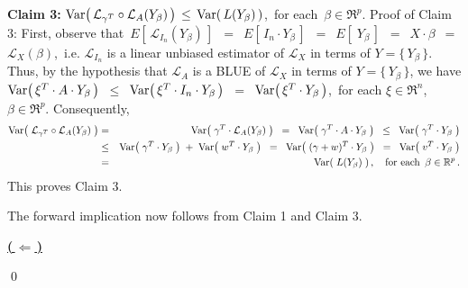 \vskip 0.5cm
\noindent
\textbf{Claim 3:}\quad
$\textnormal{Var}\!\left(\,\mathcal{L}_{\gamma^{T}}\circ\mathcal{L}_{A}(Y_{\beta})\,\right)
\,\leq\,
	\textnormal{Var}\!\left(\,L(Y_{\beta})\,\right)$,\,
for each \,$\beta\in\Re^{p}$.
\vskip 0.1cm
\noindent
Proof of Claim 3:\quad
First, observe that
\,$E\!\left[\,\mathcal{L}_{I_{n}}(Y_{\beta})\,\right]$
\,$=$\, $E\!\left[\,I_{n} \cdot Y_{\beta}\,\right]$
\,$=$\, $E\!\left[\;Y_{\beta}\,\right]$
\,$=$\, $X \cdot \beta$
\,$=$\, $\mathcal{L}_{X}(\beta)$,\,
i.e. $\mathcal{L}_{I_{n}}$ is a linear unbiased estimator of $\mathcal{L}_{X}$
in terms of $Y = \{\,Y_{\beta}\,\}$.
Thus, by the hypothesis that $\mathcal{L}_{A}$ is a BLUE of $\mathcal{L}_{X}$ in terms of $Y = \{\,Y_{\beta}\,\}$,
we have
$\textnormal{Var}\!\left(\,\xi^{T} \cdot A \cdot Y_{\beta}\,\right)$
\,$\leq$\, $\textnormal{Var}\!\left(\,\xi^{T} \cdot I_{n} \cdot Y_{\beta}\,\right)$
\,$=$\, $\textnormal{Var}\!\left(\,\xi^{T} \cdot Y_{\beta}\,\right)$,\,
for each $\xi \in \Re^{n}$, $\beta\in\Re^{p}$.
Consequently,
\begin{eqnarray*}
\Var\!\left(\; \mathcal{L}_{\gamma^{T}} \circ \mathcal{L}_{A}(Y_{\beta}) \;\right)
&=&
	\Var\!\left(\; \gamma^{T} \cdot \mathcal{L}_{A}(Y_{\beta}) \;\right)
\;\; = \;\;
	\Var\!\left(\; \gamma^{T} \cdot A \cdot Y_{\beta} \;\right)
\;\; \leq \;\;
	\Var\!\left(\; \gamma^{T} \cdot Y_{\beta} \;\right)
\\
&\leq&
	\Var\!\left(\; \gamma^{T} \cdot Y_{\beta} \;\right)
	\; + \;
	\Var\!\left(\; w^{T} \cdot Y_{\beta} \;\right)
\;\;=\;\;
	\Var\!\left(\; (\gamma + w)^{T} \cdot Y_{\beta} \;\right)
\;\; = \;\;
	\Var\!\left(\; v^{T} \cdot Y_{\beta} \;\right)
\\
&=&
	\Var\!\left(\; L(Y_{\beta}) \;\right),
\quad
\textnormal{for each \,$\beta\in\Re^{p}$}\,.
\end{eqnarray*}
This proves Claim 3.

\vskip 0.5cm
\noindent
The forward implication now follows from Claim 1 and Claim 3.

\vskip 0.5cm
\noindent
\textbf{\underline{(\,$\Longleftarrow$\,)}}\quad

\qed


